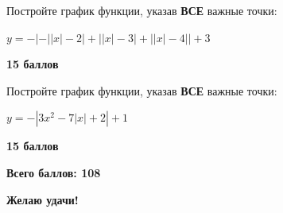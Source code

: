  Постройте график функции, указав \textbf{ВСЕ} важные точки:

$y=-\left|-\left|\left|x\right|-2\right|+\left|\left|x\right|-3\right|+\left|\left|x\right|-4\right|\right|+3$

\begin{flushright} \textbf{15 баллов}\\ 
\end{flushright}

 Постройте график функции, указав \textbf{ВСЕ} важные точки:

$y=-\left|3x^{2}-7\left|x\right|+2\right|+1$

\begin{flushright} \textbf{15 баллов}\\ 
\end{flushright}

\centerline{\bf }


\centerline{\bf  Всего баллов: 108}
\centerline{\bf  Желаю удачи!}